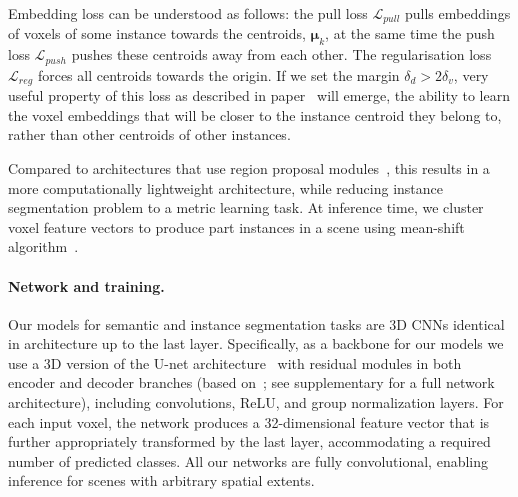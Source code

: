 Embedding loss can be understood as follows: the pull loss $\mathcal{L}_{pull}$ pulls embeddings of voxels of some instance towards the centroids, $\boldsymbol\mu_k$, at the same time the push loss $\mathcal{L}_{push}$ pushes these centroids away from each other. The regularisation loss $\mathcal{L}_{reg}$  forces all centroids towards the origin. If we set the margin $\delta_d > 2\delta_v$, very useful property of this loss as described in paper~\cite{de2017semantic} will emerge, the ability to learn the voxel embeddings that will be closer to the instance centroid they belong to, rather than other centroids of other instances.

Compared to architectures that use region proposal modules~\cite{yi2019gspn,pham2019jsis3d,engelmann20203d}, this results in a more computationally lightweight architecture, while reducing instance segmentation problem to a metric learning task.
At inference time, we cluster voxel feature vectors to produce part instances in a scene using mean-shift algorithm~\cite{comaniciu2002mean}.

\paragraph{Network and training.}
\label{methods:network_training}
Our models for semantic and instance segmentation tasks are 3D CNNs identical in architecture up to the last layer. %
Specifically, as a backbone for our models we use a 3D version of the U-net architecture~\cite{RFB15a} with residual modules in both encoder and decoder branches (based on~\cite{cciccek20163d,lee2017superhuman}; see supplementary for a full network architecture), including convolutions, ReLU, and group normalization layers.
For each input voxel, the network produces a 32-dimensional feature vector that is further appropriately transformed by the last layer, accommodating a required number of predicted classes. All our networks are fully convolutional, enabling inference for scenes with arbitrary spatial extents.



